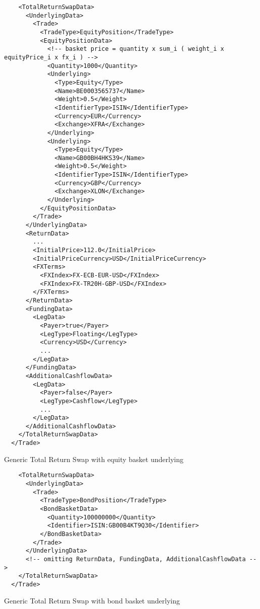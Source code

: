 \begin{listing}[H]
\begin{verbatim}
    <TotalReturnSwapData>
      <UnderlyingData>
        <Trade>
          <TradeType>EquityPosition</TradeType>
          <EquityPositionData>
            <!-- basket price = quantity x sum_i ( weight_i x equityPrice_i x fx_i ) -->
            <Quantity>1000</Quantity>
            <Underlying>
              <Type>Equity</Type>
              <Name>BE0003565737</Name>
              <Weight>0.5</Weight>
              <IdentifierType>ISIN</IdentifierType>
              <Currency>EUR</Currency>
              <Exchange>XFRA</Exchange>
            </Underlying>
            <Underlying>
              <Type>Equity</Type>
              <Name>GB00BH4HKS39</Name>
              <Weight>0.5</Weight>
              <IdentifierType>ISIN</IdentifierType>
              <Currency>GBP</Currency>
              <Exchange>XLON</Exchange>
            </Underlying>
          </EquityPositionData>
        </Trade>
      </UnderlyingData>
      <ReturnData>
        ...
        <InitialPrice>112.0</InitialPrice>
        <InitialPriceCurrency>USD</InitialPriceCurrency>
        <FXTerms>
          <FXIndex>FX-ECB-EUR-USD</FXIndex>
          <FXIndex>FX-TR20H-GBP-USD</FXIndex>
        </FXTerms>
      </ReturnData>
      <FundingData>
        <LegData>
          <Payer>true</Payer>
          <LegType>Floating</LegType>
          <Currency>USD</Currency>
          ...
        </LegData>
      </FundingData>
      <AdditionalCashflowData>
        <LegData>
          <Payer>false</Payer>
          <LegType>Cashflow</LegType>
          ...
        </LegData>
      </AdditionalCashflowData>
    </TotalReturnSwapData>
  </Trade>
\end{verbatim}
\caption{Generic Total Return Swap with equity basket underlying}
\label{lst:trsdata2}
\end{listing}

\begin{listing}[H]
\begin{verbatim}
    <TotalReturnSwapData>
      <UnderlyingData>
        <Trade>
          <TradeType>BondPosition</TradeType>
          <BondBasketData>
            <Quantity>100000000</Quantity>
            <Identifier>ISIN:GB00B4KT9Q30</Identifier>
          </BondBasketData>
        </Trade>
      </UnderlyingData>
      <!-- omitting ReturnData, FundingData, AdditionalCashflowData -->
    </TotalReturnSwapData>
  </Trade>
\end{verbatim}
\caption{Generic Total Return Swap with bond basket underlying}
\label{lst:trsdata3}
\end{listing}

